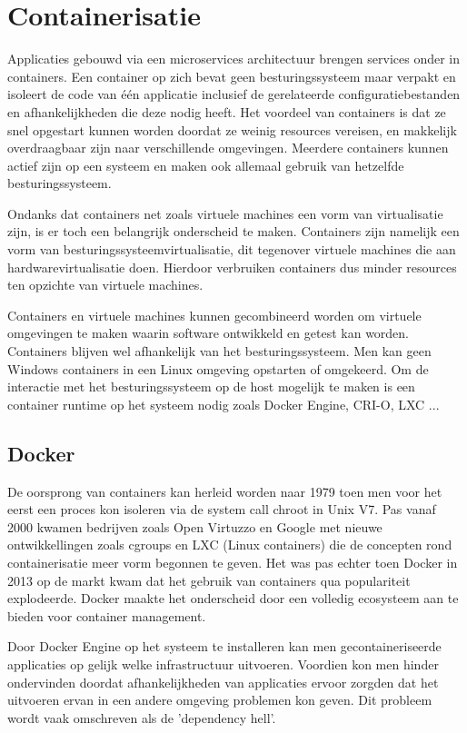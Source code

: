 \section{Containerisatie}

Applicaties gebouwd via een microservices architectuur brengen services onder in containers. Een container op zich bevat geen besturingssysteem maar verpakt en isoleert de code van één applicatie inclusief de gerelateerde configuratiebestanden en afhankelijkheden die deze nodig heeft. Het voordeel van containers is dat ze snel opgestart kunnen worden doordat ze weinig resources vereisen, en makkelijk overdraagbaar zijn naar verschillende omgevingen. Meerdere containers kunnen actief zijn op een systeem en maken ook allemaal gebruik van hetzelfde besturingssysteem. \autocite{Singh2020}

Ondanks dat containers net zoals virtuele machines een vorm van virtualisatie zijn, is er toch een belangrijk onderscheid te maken. Containers zijn namelijk een vorm van besturingssysteemvirtualisatie, dit tegenover virtuele machines die aan hardwarevirtualisatie doen.
Hierdoor verbruiken containers dus minder resources ten opzichte van virtuele machines. \autocite{Holt2018}

Containers en virtuele machines kunnen gecombineerd worden om virtuele omgevingen te maken waarin software ontwikkeld en getest kan worden. Containers blijven wel afhankelijk van het besturingssysteem. Men kan geen Windows containers in een Linux omgeving opstarten of omgekeerd. Om de interactie met het besturingssysteem op de host mogelijk te maken is een container runtime op het systeem nodig zoals Docker Engine, CRI-O, LXC ...

\subsection{Docker}

De oorsprong van containers kan herleid worden naar 1979 toen men voor het eerst een proces kon isoleren via de system call chroot in Unix V7. Pas vanaf 2000 kwamen bedrijven zoals Open Virtuzzo en Google met nieuwe ontwikkellingen zoals cgroups en LXC (Linux containers) die de concepten rond containerisatie meer vorm begonnen te geven. Het was pas echter toen Docker in 2013 op de markt kwam dat het gebruik van containers qua populariteit explodeerde. 
Docker maakte het onderscheid door een volledig ecosysteem aan te bieden voor container management.\autocite{Osnat2020} 

Door Docker Engine op het systeem te installeren kan men gecontaineriseerde applicaties op gelijk welke infrastructuur uitvoeren. Voordien kon men hinder ondervinden doordat afhankelijkheden van applicaties ervoor zorgden dat het uitvoeren ervan in een andere omgeving problemen kon geven. Dit probleem wordt vaak omschreven als de 'dependency hell'.

